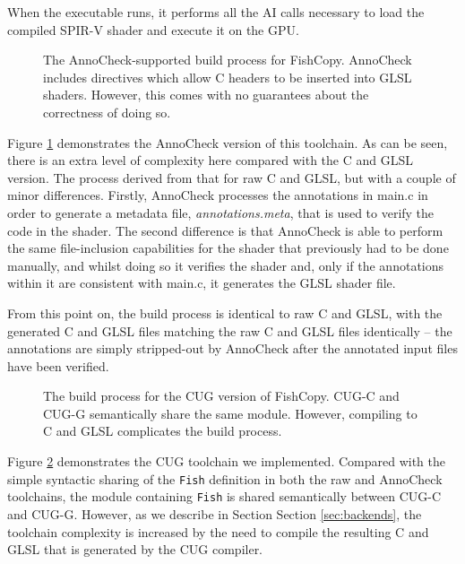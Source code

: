 \documentclass[a4paper,12pt,twoside,openright]{report}
\begin{document}
When the executable runs, it performs all the AI calls necessary to load the
compiled SPIR-V shader and execute it on the GPU.

\begin{figure}[h]
\centering
\def\svgwidth{0.8\linewidth}

\caption{The AnnoCheck-supported build process for FishCopy. AnnoCheck includes
directives which allow C headers to be inserted into GLSL shaders. However, this
comes with no guarantees about the correctness of doing so.}
\label{fig:pipeline_anno_check}
\end{figure}

Figure \ref{fig:pipeline_anno_check} demonstrates the AnnoCheck version of this
toolchain. As can be seen, there is an extra level of complexity here compared
with the C and GLSL version. The process derived from that for raw C and GLSL,
but with a couple of minor differences. Firstly, AnnoCheck processes the
annotations in main.c in order to generate a metadata file,
\textit{annotations.meta}, that is used to verify the code in the shader. The
second difference is that AnnoCheck is able to perform the same file-inclusion
capabilities for the shader that previously had to be done manually, and whilst
doing so it verifies the shader and, only if the annotations within it are
consistent with main.c, it generates the GLSL shader file.

From this point on, the build process is identical to raw C and GLSL, with the
generated C and GLSL files matching the raw C and GLSL files identically -- the
annotations are simply stripped-out by AnnoCheck after the annotated input
files have been verified.

\begin{figure}[h]
\centering
\def\svgwidth{0.8\linewidth}

\caption{The build process for the CUG version of FishCopy. CUG-C and CUG-G
semantically share the same module. However, compiling to C and GLSL
complicates the build process.}
\label{fig:pipeline_cug}
\end{figure}

Figure \ref{fig:pipeline_cug} demonstrates the CUG toolchain we implemented.
Compared with the simple syntactic sharing of the \texttt{Fish} definition in
both the raw and AnnoCheck toolchains, the module containing \texttt{Fish} is
shared semantically between CUG-C and CUG-G. However, as we describe in Section
Section \ref{sec:backends}, the toolchain complexity is increased by the need
to compile the resulting C and GLSL that is generated by the CUG compiler.
\end{document}
